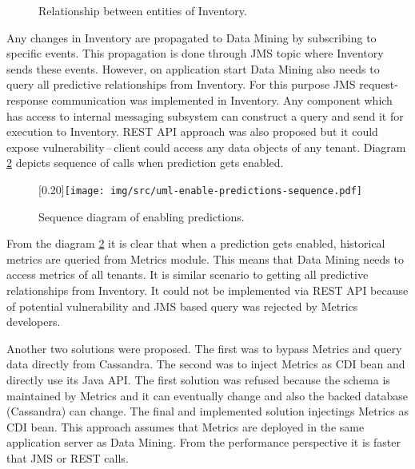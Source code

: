     \begin{figure}[H]
        \begin{center}
            \caption{Relationship between entities of Inventory.}
            \label{img:relationship}
        \end{center}
    \end{figure}

    Any changes in Inventory are propagated to Data Mining by subscribing to specific events. This propagation is done
    through JMS topic where Inventory sends these events. However, on application start Data Mining also needs to query
    all predictive relationships from Inventory. For this purpose JMS request-response communication was implemented in
    Inventory. Any component which has access to internal messaging subsystem can construct a query and send it for
    execution to Inventory. REST API approach was also proposed but it could expose vulnerability\,--\,client
    could access any data objects of any tenant. Diagram \ref{img:sequence-enab-pred} depicts sequence of calls
    when prediction gets enabled.

    \begin{figure}[H]
        \begin{center}
            \scalebox{0.30}[0.20]{\texttt{[image: img/src/uml-enable-predictions-sequence.pdf]}}
            \caption{Sequence diagram of enabling predictions.}
            \label{img:sequence-enab-pred}
        \end{center}
    \end{figure}

    From the diagram \ref{img:sequence-enab-pred} it is clear that when a prediction gets enabled, historical metrics
    are queried from Metrics module. This means that Data Mining needs to access metrics of all tenants. It is
    similar scenario to getting all predictive relationships from Inventory. It could not be implemented via REST API
    because of potential vulnerability and JMS based query was rejected by Metrics developers.

    Another two solutions were proposed. The first was to bypass Metrics and query data directly from Cassandra.
    The second was to inject Metrics as CDI bean and directly use its Java API. The first solution was refused because
    the schema is maintained by Metrics and it can eventually change and also the backed database (Cassandra) can
    change. The final and implemented solution injectings Metrics as CDI bean. This approach assumes that Metrics
    are deployed in the same application server as Data Mining. From the performance perspective it is faster that
    JMS or REST calls.

